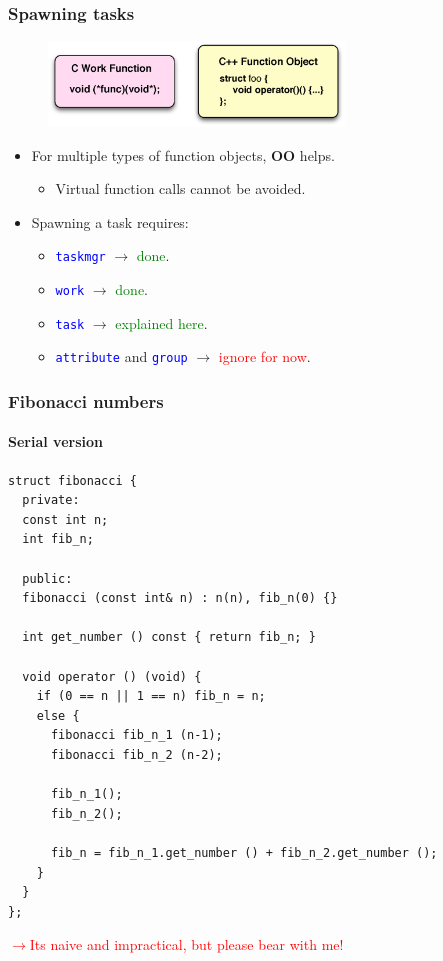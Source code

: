 \documentclass{beamer}
\newcommand{\code}[1]{\lstinline[basicstyle=\sffamily]{#1}}
\begin{document}
\begin{frame} 
\frametitle{Spawning tasks}
\begin{figure}
\centering
\includegraphics[width=0.7\textwidth]{figs/functors}
\end{figure}
\begin{itemize}
\item For multiple types of function objects, \textbf{OO} helps.
  \begin{itemize}
  \item Virtual function calls cannot be avoided.
  \end{itemize}
\item Spawning a task requires:
  \begin{itemize}
  \item \textcolor{blue}{\code{taskmgr}} $\rightarrow{}$ \textcolor{green}{done}.
  \item \textcolor{blue}{\code{work}} $\rightarrow{}$ \textcolor{green}{done}.
  \item \textcolor{blue}{\code{task}} $\rightarrow{}$ \textcolor{green}{explained here}.
  \item \textcolor{blue}{\code{attribute}} and \textcolor{blue}{\code{group}} $\rightarrow{}$ \textcolor{red}{ignore for now}.
  \end{itemize}
\end{itemize}
\end{frame}

\begin{frame}[fragile]
\frametitle{Fibonacci numbers}
\framesubtitle{Serial version}
\begin{center}
\begin{minipage}{0.5\textwidth}
\begin{lstlisting}
struct fibonacci {
  private:
  const int n;
  int fib_n;

  public:
  fibonacci (const int& n) : n(n), fib_n(0) {}

  int get_number () const { return fib_n; }

  void operator () (void) {
    if (0 == n || 1 == n) fib_n = n;
    else {
      fibonacci fib_n_1 (n-1);
      fibonacci fib_n_2 (n-2);

      fib_n_1();
      fib_n_2();

      fib_n = fib_n_1.get_number () + fib_n_2.get_number ();
    }
  }
};
\end{lstlisting}
\end{minipage}
\end{center}
\begin{center}
\textcolor{red}{$\rightarrow{}$Its naive and impractical, but please bear with
me!}
\end{center}
\end{frame}
\end{document}
